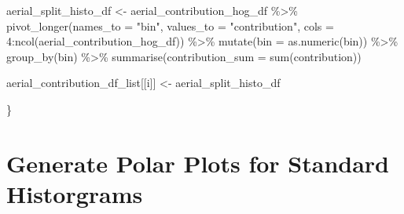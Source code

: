 \documentclass[
  letterpaper,
  DIV=11,
  numbers=noendperiod]{scrreprt}
\newenvironment{Shaded}{\begin{snugshade}}{\end{snugshade}}
\newcommand{\AttributeTok}[1]{\textcolor[rgb]{0.40,0.45,0.13}{#1}}
\newcommand{\DecValTok}[1]{\textcolor[rgb]{0.68,0.00,0.00}{#1}}
\newcommand{\FunctionTok}[1]{\textcolor[rgb]{0.28,0.35,0.67}{#1}}
\newcommand{\NormalTok}[1]{\textcolor[rgb]{0.00,0.23,0.31}{#1}}
\newcommand{\OtherTok}[1]{\textcolor[rgb]{0.00,0.23,0.31}{#1}}
\newcommand{\SpecialCharTok}[1]{\textcolor[rgb]{0.37,0.37,0.37}{#1}}
\newcommand{\StringTok}[1]{\textcolor[rgb]{0.13,0.47,0.30}{#1}}
\begin{document}
\begin{Shaded}
\begin{Highlighting}[]
\NormalTok{  aerial\_split\_histo\_df }\OtherTok{\textless{}{-}} 
\NormalTok{    aerial\_contribution\_hog\_df }\SpecialCharTok{\%\textgreater{}\%}
    \FunctionTok{pivot\_longer}\NormalTok{(}\AttributeTok{names\_to =} \StringTok{"bin"}\NormalTok{, }
                 \AttributeTok{values\_to =} \StringTok{"contribution"}\NormalTok{, }
                 \AttributeTok{cols =} \DecValTok{4}\SpecialCharTok{:}\FunctionTok{ncol}\NormalTok{(aerial\_contribution\_hog\_df)) }\SpecialCharTok{\%\textgreater{}\%}
    \FunctionTok{mutate}\NormalTok{(}\AttributeTok{bin =} \FunctionTok{as.numeric}\NormalTok{(bin)) }\SpecialCharTok{\%\textgreater{}\%}
    \FunctionTok{group\_by}\NormalTok{(bin) }\SpecialCharTok{\%\textgreater{}\%}
    \FunctionTok{summarise}\NormalTok{(}\AttributeTok{contribution\_sum =} \FunctionTok{sum}\NormalTok{(contribution))}
  
  
\NormalTok{  aerial\_contribution\_df\_list[[i]] }\OtherTok{\textless{}{-}}\NormalTok{ aerial\_split\_histo\_df}

\NormalTok{\}}
\end{Highlighting}
\end{Shaded}

\section{Generate Polar Plots for Standard
Historgrams}\label{generate-polar-plots-for-standard-historgrams}
\end{document}
